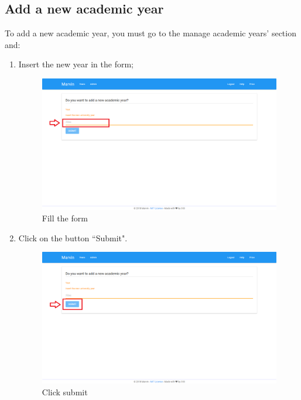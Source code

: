 \documentclass[ManualeUtente]{subfiles}
\begin{document}
\subsection{Add a new academic year}
To add a new academic year, you must go to the manage academic years' section and:
\begin{enumerate}
	\item Insert the new year in the form;
	\begin{figure}[H]
		\centering
		\includegraphics[width=0.7\linewidth]{image/UniversityAddYear1}
		\caption[Add year form]{Fill the form}
		\label{fig:Add a new academic year, fill the form}
	\end{figure}
	\item Click on the button ``Submit".
	\begin{figure}[H]
		\centering
		\includegraphics[width=0.7\linewidth]{image/UniversityAddYear2}
		\caption[Add year submit]{Click submit}
		\label{fig:CLick submit}
	\end{figure}
\end{enumerate}
\end{document}
